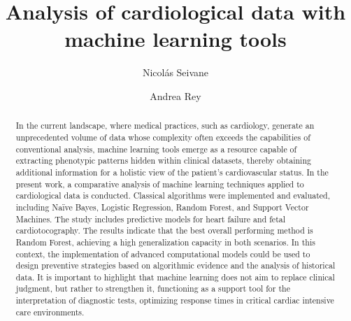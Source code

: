 \documentclass{llncs}
\begin{document}
%
\title{Analysis of cardiological data with machine learning tools}

%
\author{Nicolás Seivane \and
Andrea Rey}
%
%
%
\authorrunning{}
%
%
\maketitle              %
%
\begin{abstract}
In the current landscape, where medical practices, such as cardiology, generate an unprecedented volume of data whose complexity often exceeds the capabilities of conventional analysis, machine learning tools emerge as a resource capable of extracting phenotypic patterns hidden within clinical datasets, thereby obtaining additional information for a holistic view of the patient's cardiovascular status. 
In the present work, a comparative analysis of machine learning techniques applied to cardiological data is conducted. Classical algorithms were implemented and evaluated, including Naïve Bayes, Logistic Regression, Random Forest, and Support Vector Machines. The study includes predictive models for heart failure and fetal cardiotocography. The results indicate that the best overall performing method is Random Forest, achieving a high generalization capacity in both scenarios.
In this context, the implementation of advanced computational models could be used to design preventive strategies based on algorithmic evidence and the analysis of historical data. It is important to highlight that machine learning does not aim to replace clinical judgment, but rather to strengthen it, functioning as a support tool for the interpretation of diagnostic tests, optimizing response times in critical cardiac intensive care environments.

\end{abstract}
\end{document}
